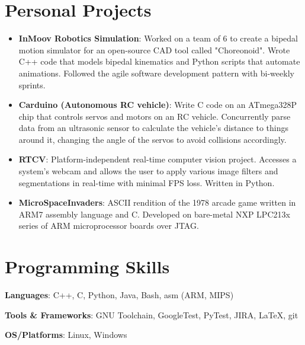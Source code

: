 \documentclass[letterpaper,11pt]{article}
\newcommand{\resumeItem}[2]{
  \item\small{
    \textbf{#1}{: #2 \vspace{-2pt}}
  }
}
\newcommand{\resumeSubItem}[2]{\resumeItem{#1}{#2}\vspace{-4pt}}
\newcommand{\resumeSubHeadingListStart}{\begin{itemize}[leftmargin=*]}
\newcommand{\resumeSubHeadingListEnd}{\end{itemize}}
\begin{document}
\section{Personal Projects}
\resumeSubHeadingListStart
\resumeSubItem{InMoov Robotics Simulation}
{Worked on a team of 6 to create a bipedal motion simulator for an open-source CAD tool called "Choreonoid". Wrote C++ code that models bipedal kinematics and Python scripts that automate animations. Followed the agile software development pattern with bi-weekly sprints.} \vspace{1.5mm}
\resumeSubItem{Carduino (Autonomous RC vehicle)}
{Write C code on an ATmega328P chip that controls servos and motors on an RC vehicle. Concurrently parse data from an ultrasonic sensor to calculate the vehicle's distance to things around it, changing the angle of the servos to avoid collisions accordingly. }\vspace{1.5mm}
\iffalse
\resumeSubItem{I'm Hungry}
{Full-stack developer for a Node.js Yelp clone. Integrated back-end and database MySQL functionality with AWS. Wrote registration, log-in, and session storing modules; regularly back-up database. }\vspace{1.5mm}
\fi
\resumeSubItem{RTCV}{Platform-independent real-time computer vision project. Accesses a system's webcam and allows the user to apply various image filters and segmentations in real-time with minimal FPS loss. Written in Python.}
\resumeSubItem{MicroSpaceInvaders}{ASCII rendition of the 1978 arcade game written in ARM7 assembly language and C. Developed on bare-metal NXP LPC213x series of ARM microprocessor boards over JTAG.}

\iffalse
\resumeSubItem{CppNews}{Used the Twitter open API with Python library Tweepy to make a data-scraping bot. Retweets things related to the C++ language if it's deemed popular by internal API data (number of likes relative to followers, follower engagement, etc).}
\fi

\resumeSubHeadingListEnd


%
\section{Programming Skills}
 \resumeSubHeadingListStart
   \item{
     \textbf{Languages}{: C++, C, Python, Java, Bash, asm (ARM, MIPS)} }
     \hfill
     \item{
      \textbf{Tools \& Frameworks}{: GNU Toolchain, GoogleTest, PyTest, JIRA, \LaTeX, git
   } 
\item{
	\textbf{OS/Platforms}{: Linux, Windows} }

\iffalse
	\item{\textbf{Notable Courses}{: Operating Systems, Machine Learning, Computer Vision, Hardware-Software Integration} }
\fi
} 
 \resumeSubHeadingListEnd
 


\end{document}
